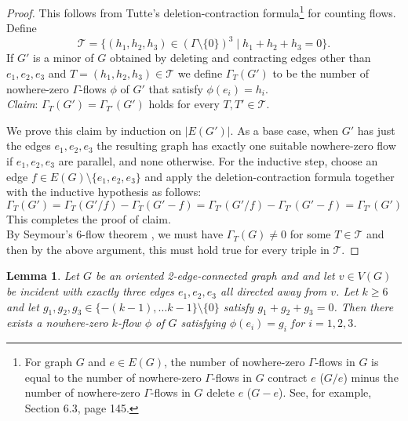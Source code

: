 \documentclass[12pt]{article}
\newtheorem{lemma}[theorem]{Lemma}
\begin{document}
\begin{proof}
    This follows from Tutte's deletion-contraction formula\footnote{For graph $G$ and $e \in E(G)$, the number of nowhere-zero $\Gamma$-flows in $G$ is equal to the number of nowhere-zero $\Gamma$-flows in $G$ contract $e$ ($G / e$) minus the number of nowhere-zero $\Gamma$-flows in $G$ delete $e$ ($G - e$). See, for example, \cite{Diestel3rdEdition} Section 6.3, page 145.} for counting flows.  Define
    \[ \mathcal{T} = \{ (h_1, h_2, h_3) \in ( \Gamma \setminus \{0\} )^3 \mid h_1 + h_2 + h_3 = 0 \}. \]
    If $G'$ is a minor of $G$ obtained by deleting and contracting edges other than $e_1, e_2, e_3$ and $T = (h_1, h_2, h_3) \in \mathcal{T}$ we define $\Gamma_T(G')$ to be the number of nowhere-zero $\Gamma$-flows $\phi$ of $G'$ that satisfy $\phi(e_i) = h_i$.\\
    
    \noindent\emph{Claim}:  
    $\Gamma_T(G') = \Gamma_{T'}(G')$
    holds for every $T,T' \in \mathcal{T}$. 
    
    We prove this claim by induction on $|E(G')|$.  As a base case, when $G'$ has just the edges $e_1, e_2, e_3$ the resulting graph has exactly one suitable nowhere-zero flow if $e_1, e_2, e_3$ are parallel, and none otherwise.  For the inductive step, choose an edge $f \in E(G) \setminus \{e_1,e_2,e_3\}$ and apply the deletion-contraction formula together with the inductive hypothesis as follows:
    \[ \Gamma_T(G') = \Gamma_T(G' / f) - \Gamma_T(G' - f ) = \Gamma_{T'}(G' / f) - \Gamma_{T'}(G' - f) = \Gamma_{T'}(G') \]
    This completes the proof of claim.\\

    
    By Seymour's 6-flow theorem \cite{Seymour6flow}, we must have $\Gamma_T(G) \neq 0$ for some $T \in \mathcal{T}$ and then by the above argument, this must hold true for every triple in $\mathcal{T}$.
\end{proof}

\begin{lemma}\label{prespecify_vertex_integer}
    Let $G$ be an oriented 2-edge-connected graph and and let $v \in V(G)$ be incident with exactly three edges $e_1, e_2, e_3$ all directed away from $v$.  Let $k \ge 6$ and let $g_1, g_2, g_3 \in \{ -(k-1), \ldots k-1 \} \setminus \{0\}$ satisfy $g_1 + g_2 + g_3 = 0$.  Then there exists a nowhere-zero $k$-flow $\phi$ of $G$ satisfying $\phi(e_i) = g_i$ for $i=1,2,3$.
\end{lemma}
\end{document}
